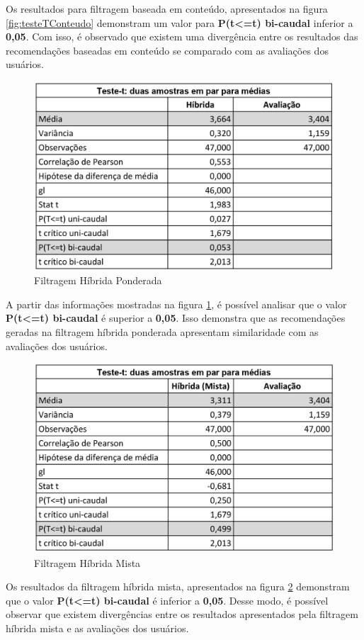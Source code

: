 Os resultados para filtragem baseada em conteúdo, apresentados na figura \ref{fig:testeTConteudo} demonstram um valor para \textbf{P(t<=t) bi-caudal} inferior a \textbf{0,05}. Com isso, é observado que existem uma divergência entre os resultados das recomendações baseadas em conteúdo se comparado com as avaliações dos usuários.

\begin{figure}[H]
	\centering
	\includegraphics[width=.7\linewidth]{imagens/testeTPonderada.jpg}
	\caption[Teste T: Filtragem Híbrida Ponderada]{Filtragem Híbrida Ponderada}
    \label{fig:testeTPonderado}
\end{figure}

A partir das informações mostradas na figura \ref{fig:testeTPonderado}, é possível analisar que o valor \textbf{P(t<=t) bi-caudal} é superior a \textbf{0,05}. Isso demonstra que as recomendações geradas na filtragem híbrida ponderada apresentam similaridade com as avaliações dos usuários.

\begin{figure}[H]
	\centering
	\includegraphics[width=.7\linewidth]{imagens/testeTMisto.jpg}
	\caption[Teste T: Filtragem Híbrida Mista]{Filtragem Híbrida Mista}
    \label{fig:testeTMisto}
\end{figure}

Os resultados da filtragem híbrida mista, apresentados na figura \ref{fig:testeTMisto} demonstram que o valor \textbf{P(t<=t) bi-caudal} é inferior a \textbf{0,05}. Desse modo, é possível observar que existem divergências entre os resultados apresentados pela filtragem híbrida mista e as avaliações dos usuários.

